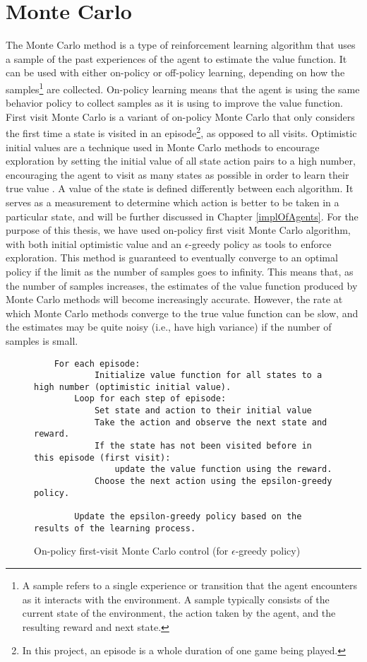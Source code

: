 \section{Monte Carlo}
The Monte Carlo method is a type of reinforcement learning algorithm that uses a sample of the past experiences of the agent to estimate the value function. It can be used with either on-policy or off-policy learning, depending on how the samples\footnote{A sample refers to a single experience or transition that the agent encounters as it interacts with the environment. A sample typically consists of the current state of the environment, the action taken by the agent, and the resulting reward and next state.} are collected. On-policy learning means that the agent is using the same behavior policy to collect samples as it is using to improve the value function. First visit Monte Carlo is a variant of on-policy Monte Carlo that only considers the first time a state is visited in an episode\footnote{In this project, an episode is a whole duration of one game being played.}, as opposed to all visits. Optimistic initial values are a technique used in Monte Carlo methods to encourage exploration by setting the initial value of all state action pairs to a high number, encouraging the agent to visit as many states as possible in order to learn their true value \citep{RLSuttonBarto}. A value of the state is defined differently between each algorithm. It serves as a measurement to determine which action is better to be taken in a particular state, and will be further discussed in Chapter \ref{implOfAgents}.  For the purpose of this thesis, we have used on-policy first visit Monte Carlo algorithm, with both initial optimistic value and an $\epsilon$-greedy policy as tools to enforce exploration. This method is guaranteed to eventually converge to an optimal policy if the limit as the number of samples goes to infinity. This means that, as the number of samples increases, the estimates of the value function produced by Monte Carlo methods will become increasingly accurate. However, the rate at which Monte Carlo methods converge to the true value function can be slow, and the estimates may be quite noisy (i.e., have high variance) if the number of samples is small.

\begin{figure}[h]
    \centering
    \begin{lstlisting}
    For each episode:
    		Initialize value function for all states to a high number (optimistic initial value).
		Loop for each step of episode:
			Set state and action to their initial value
			Take the action and observe the next state and reward.
			If the state has not been visited before in this episode (first visit):
				update the value function using the reward.
			Choose the next action using the epsilon-greedy policy.
		
		Update the epsilon-greedy policy based on the results of the learning process.
	\end{lstlisting}	
    \caption{On-policy first-visit Monte Carlo control (for $\epsilon$-greedy policy)}
    \label{algo:MC}
\end{figure}

